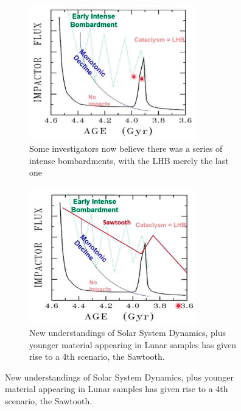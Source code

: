 \documentclass[]{article}
\begin{document}
\begin{figure}[H]
\begin{subfigure}[t]{0.45\textwidth}
	\end{subfigure}
	\begin{subfigure}[t]{0.45\textwidth}
		\caption{Some investigators now believe there was a series of intense bombardments, with the LHB merely the last one}
		\includegraphics[width=0.8\textwidth]{LunarImpactFluxModelsEIBplusLHB}
	\end{subfigure}
	\begin{subfigure}[t]{0.45\textwidth}
		\caption{New understandings of Solar System Dynamics, plus younger material appearing in Lunar samples has given rise to a 4th scenario, the Sawtooth.}
		\includegraphics[width=0.8\textwidth]{LunarImpactFluxModelsNice}
	\end{subfigure}
\end{figure}
\end{document}

